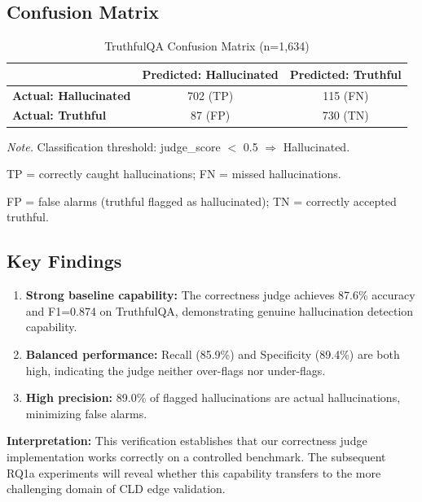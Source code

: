 \subsection{Confusion Matrix}

\begin{table}[H]
\centering
\caption{TruthfulQA Confusion Matrix (n=1,634)}
\label{tab:truthqa_confusion}
\begin{threeparttable}
\begin{tabular}{lcc}
\toprule
 & \textbf{Predicted: Hallucinated} & \textbf{Predicted: Truthful} \\
\midrule
\textbf{Actual: Hallucinated} & 702 (TP) & 115 (FN) \\
\textbf{Actual: Truthful} & 87 (FP) & 730 (TN) \\
\bottomrule
\end{tabular}
\begin{tablenotes}
\small
\item \textit{Note.} Classification threshold: judge\_score $<$ 0.5 $\Rightarrow$ Hallucinated.
\item TP = correctly caught hallucinations; FN = missed hallucinations.
\item FP = false alarms (truthful flagged as hallucinated); TN = correctly accepted truthful.
\end{tablenotes}
\end{threeparttable}
\end{table}

\subsection{Key Findings}

\begin{enumerate}[noitemsep]
    \item \textbf{Strong baseline capability:} The correctness judge achieves 87.6\% accuracy and F1=0.874 on TruthfulQA, demonstrating genuine hallucination detection capability.
    \item \textbf{Balanced performance:} Recall (85.9\%) and Specificity (89.4\%) are both high, indicating the judge neither over-flags nor under-flags.
    \item \textbf{High precision:} 89.0\% of flagged hallucinations are actual hallucinations, minimizing false alarms.
\end{enumerate}

\textbf{Interpretation:} This verification establishes that our correctness judge implementation works correctly on a controlled benchmark. The subsequent RQ1a experiments will reveal whether this capability transfers to the more challenging domain of CLD edge validation.

